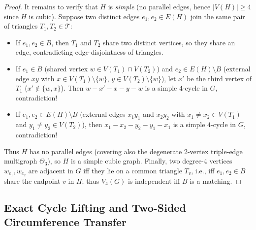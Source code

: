 \documentclass[11pt,reqno]{amsart}
\theoremstyle{plain}
\theoremstyle{definition}
\theoremstyle{remark}
\DeclareRobustCommand{\_}{\ifmmode\text{\textunderscore}\else\textunderscore\allowbreak\fi}
\begin{document}
\begin{proof}
It remains to verify that $H$ is \emph{simple} (no parallel edges, hence $|V(H)| \ge 4$ since $H$ is cubic). Suppose two distinct edges $e_1, e_2 \in E(H)$ join the same pair of triangles $T_1, T_2 \in \mathcal{T}$:
\begin{itemize}[leftmargin=1.6em]
  \item If $e_1, e_2 \in B$, then $T_1$ and $T_2$ share two distinct vertices, so they share an edge, contradicting edge-disjointness of triangles.
  \item If $e_1 \in B$ (shared vertex $w \in V(T_1) \cap V(T_2)$) and $e_2 \in E(H) \setminus B$ (external edge $xy$ with $x \in V(T_1) \setminus \{w\}$, $y \in V(T_2) \setminus \{w\}$), let $x'$ be the third vertex of $T_1$ ($x' \notin \{w, x\}$). Then $w - x' - x - y - w$ is a simple $4$-cycle in $G$, contradiction!
  \item If $e_1, e_2 \in E(H) \setminus B$ (external edges $x_1 y_1$ and $x_2 y_2$ with $x_1 \neq x_2 \in V(T_1)$ and $y_1 \neq y_2 \in V(T_2)$), then $x_1 - x_2 - y_2 - y_1 - x_1$ is a simple $4$-cycle in $G$, contradiction!
\end{itemize}
Thus $H$ has no parallel edges (covering also the degenerate $2$-vertex triple-edge multigraph $\Theta_3$), so $H$ is a simple cubic graph. Finally, two degree-$4$ vertices $w_{e_1}, w_{e_2}$ are adjacent in $G$ iff they lie on a common triangle $T_v$, i.e., iff $e_1, e_2 \in B$ share the endpoint $v$ in $H$; thus $V_4(G)$ is independent iff $B$ is a matching.
\end{proof}

\subsection{Exact Cycle Lifting and Two-Sided Circumference Transfer}\label{subsec:lift}
\end{document}
